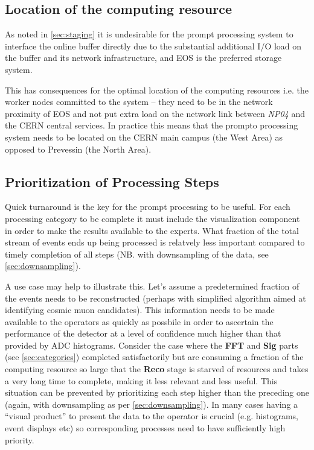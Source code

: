 \documentclass[pdftex,12pt,letter]{article}
\newcommand{\expname}{\textit{NP04}\xspace}
\begin{document}
\subsection{Location of the computing resource}
As noted in \ref{sec:staging} it is undesirable for the prompt processing system to interface the online
buffer directly due to the substantial additional I/O load on the buffer and its network infrastructure,
and EOS is the preferred storage system.

This has consequences for the optimal location of the computing resources i.e. the worker nodes
committed to the system -- they need to be in the network proximity of EOS and not put extra
load on the network link between \expname and the CERN central services. In practice this means
that the prompto processing system needs to be located on the CERN main campus (the West Area)
as opposed to Prevessin (the North Area).


\subsection{Prioritization of Processing Steps}
\label{sec:priority}
Quick turnaround is the key for the prompt processing to be useful. For each processing category
to be complete it must include the visualization component in order to make the results available
to the experts. What fraction of the total stream of events ends up being processed is relatvely less
important compared to timely completion of all steps (NB. with downsampling of the data, see 
\ref{sec:downsampling}).

A use case may help to illustrate this. Let's assume a predetermined fraction of the events needs to
be reconstructed (perhaps with simplified algorithm aimed at identifying cosmic muon candidates).
This information needs to be made available to the operators as quickly as possbile in order to ascertain the performance
of the detector at a level of confidence much higher than that provided by ADC histograms.
Consider the case where the \textbf{FFT} and \textbf{Sig} parts (see \ref{sec:categories})
completed satisfactorily but are consuming a fraction of the computing resource so large that
the  \textbf{Reco} stage is starved of resources and takes a very long time to complete, making
it less relevant and less useful. This situation can be prevented by prioritizing each step higher
than the preceding one (again, with downsampling as per \ref{sec:downsampling}). In many
cases having a ``visual product'' to present the data to the operator is crucial (e.g. histograms,
event displays etc) so corresponding processes need to have sufficiently high priority.
\end{document}

